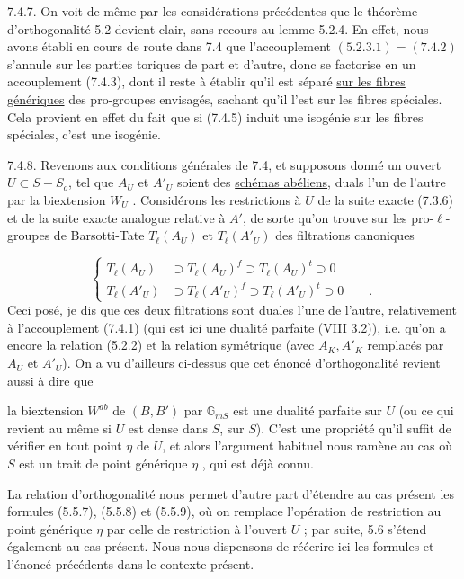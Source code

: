 
7.4.7. On voit de même par les considérations précédentes que le théorème d'orthogonalité 5.2 devient clair, sans recours au lemme 5.2.4. En effet, nous avons établi en cours de route dans 7.4 que l'accouplement $(5.2.3.1)=(7.4.2)$ s'annule sur les parties toriques de part et d'autre, donc se factorise en un accouplement (7.4.3), dont il reste à établir qu'il est séparé \underline{sur les fibres génériques} des pro-groupes envisagés, sachant qu'il l'est sur les fibres spéciales. Cela provient en effet du fait que si (7.4.5) induit une isogénie sur les fibres spéciales, c'est une isogénie.

7.4.8. Revenons aux conditions générales de 7.4, et supposons donné un ouvert $U \subset S-S_o$, tel que $A_U$ et $A'_U$ soient des \underline{schémas abéliens}, duals l'un de l'autre par la biextension $W_U$ . Considérons les restrictions à $U$ de la suite exacte (7.3.6) et de la suite exacte analogue relative à $A'$, de sorte qu'on trouve sur les pro-$\ell$-groupes de Barsotti-Tate $T_\ell(A_U)$ et $T_\ell(A'_U)$ des filtrations canoniques

\begin{equation}\tag{7.4.9}
\left\{\begin{aligned} T_\ell(A_U) &\supset T_\ell(A_U)^f \supset T_\ell(A_U)^t \supset 0 \\[4ex] T_\ell(A'_U) &\supset T_\ell(A'_U)^f \supset T_\ell(A'_U)^t \supset 0 \qquad . \end{aligned}\right.
\end{equation}
Ceci posé, je dis que \underline{ces deux filtrations sont duales l'une de l'autre}, relativement à l'accouplement (7.4.1) (qui est ici une dualité parfaite (VIII 3.2)), i.e. qu'on a encore la relation (5.2.2) et la relation symétrique (avec $A_K,A'_K$ remplacés par $A_U$ et $A'_U$). On a vu d'ailleurs ci-dessus que cet énoncé d'orthogonalité revient aussi à dire que



la biextension $W^{ab}$ de $(B,B')$ par $\mathbb{G}_{mS}$ est une dualité parfaite sur $U$ (ou ce qui revient au même si $U$ est dense dans $S$, sur $S$). C'est une propriété qu'il suffit de vérifier en tout point $\eta$ de $U$, et alors l'argument habituel nous ramène au cas où $S$ est un trait de point générique $\eta$ , qui est déjà connu.

La relation d'orthogonalité nous permet d'autre part d'étendre au cas présent les formules (5.5.7), (5.5.8) et (5.5.9), où on remplace l'opération de restriction au point générique $\eta$ par celle de restriction à l'ouvert $U$ ; par suite, 5.6 s'étend également au cas présent. Nous nous dispensons de réécrire ici les formules et l'énoncé précédents dans le contexte présent.

